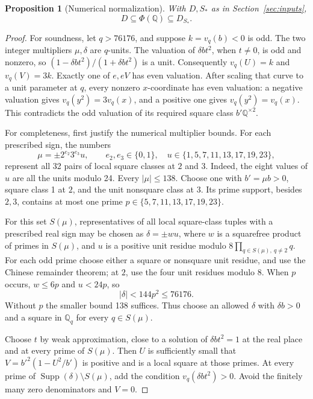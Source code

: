 \documentclass[11pt]{article}
\newtheorem{proposition}[theorem]{Proposition}
\theoremstyle{definition}
\newcommand{\Q}{\mathbb Q}\newcommand{\Z}{\mathbb Z}
\newcommand{\Supp}{\operatorname{Supp}}
\begin{document}
\begin{proposition}[Numerical normalization]\label{prop:explicit-phi}
With \(D,S_*\) as in Section~\ref{sec:inputs},
\[
                         D\subseteq\Phi(\Q)\subseteq D_{S_*}.
\]
\end{proposition}

\begin{proof}
For soundness, let \(q>76176\), and suppose \(k=v_q(b)<0\) is
odd. The two integer multipliers \(\mu,\delta\) are \(q\)-units.
The valuation of \(\delta bt^2\), when \(t\ne0\), is odd and
nonzero, so \((1-\delta bt^2)/(1+\delta bt^2)\) is a unit.
Consequently \(v_q(U)=k\) and \(v_q(V)=3k\). Exactly one of
\(e,eV\) has even valuation. After scaling that curve to a unit
parameter at \(q\), every nonzero \(x\)-coordinate has even
valuation: a negative valuation gives \(v_q(y^2)=3v_q(x)\), and
a positive one gives \(v_q(y^2)=v_q(x)\). This contradicts the
odd valuation of its required square class \(b'\Q^{\times2}\).

For completeness, first justify the numerical multiplier bounds.
For each prescribed sign, the numbers
\[
 \mu=\pm2^{e_2}3^{e_3}u,\qquad e_2,e_3\in\{0,1\},\quad
 u\in\{1,5,7,11,13,17,19,23\},
\]
represent all 32 pairs of local square classes at \(2\) and \(3\).
Indeed, the eight values of \(u\) are all the units modulo 24.
Every \(|\mu|\le138\). Choose one with \(b'=\mu b>0\),
square class 1 at \(2\), and the unit nonsquare class at \(3\).
Its prime support, besides \(2,3\), contains at most one prime
\(p\in\{5,7,11,13,17,19,23\}\).

For this set \(S(\mu)\), representatives of all local square-class
tuples with a prescribed real sign may be chosen as
\(\delta=\pm wu\), where \(w\) is a squarefree product of
primes in \(S(\mu)\), and \(u\) is a positive unit residue
modulo \(8\prod_{q\in S(\mu),\ q\ne2}q\). For each odd prime
choose either a square or nonsquare unit residue, and use the Chinese
remainder theorem; at \(2\), use the four unit residues modulo 8.
When \(p\) occurs, \(w\le6p\) and \(u<24p\), so
\[
                         |\delta|<144p^2\le76176.
\]
Without \(p\) the smaller bound 138 suffices. Thus choose an
allowed \(\delta\) with \(\delta b>0\) and a square in
\(\Q_q\) for every \(q\in S(\mu)\).

Choose \(t\) by weak approximation, close to a solution of
\(\delta bt^2=1\) at the real place and at every prime of
\(S(\mu)\). Then \(U\) is sufficiently small that
\(V=b'^2(1-U^2/b')\) is positive and is a local square at those
primes. At every prime of \(\Supp(\delta)\setminus S(\mu)\),
add the condition \(v_q(\delta bt^2)>0\). Avoid the finitely many
zero denominators and \(V=0\).


\end{proof}
\end{document}
